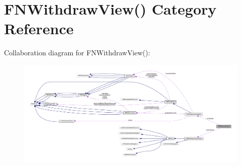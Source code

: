 \hypertarget{category_f_n_withdraw_view_07_08}{}\section{F\+N\+Withdraw\+View() Category Reference}
\label{category_f_n_withdraw_view_07_08}


Collaboration diagram for F\+N\+Withdraw\+View()\+:\nopagebreak
\begin{figure}[H]
\begin{center}
\leavevmode
\includegraphics[width=350pt]{category_f_n_withdraw_view_07_08__coll__graph}
\end{center}
\end{figure}
